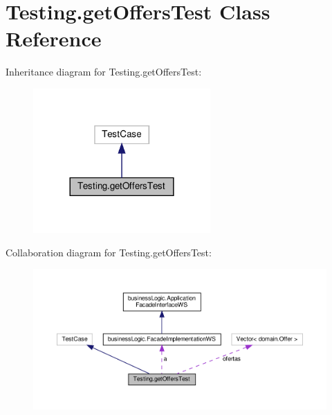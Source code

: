 \hypertarget{class_testing_1_1get_offers_test}{}\section{Testing.\+get\+Offers\+Test Class Reference}
\label{class_testing_1_1get_offers_test}


Inheritance diagram for Testing.\+get\+Offers\+Test\+:
\nopagebreak
\begin{figure}[H]
\begin{center}
\leavevmode
\includegraphics[width=192pt]{class_testing_1_1get_offers_test__inherit__graph}
\end{center}
\end{figure}


Collaboration diagram for Testing.\+get\+Offers\+Test\+:
\nopagebreak
\begin{figure}[H]
\begin{center}
\leavevmode
\includegraphics[width=350pt]{class_testing_1_1get_offers_test__coll__graph}
\end{center}
\end{figure}
